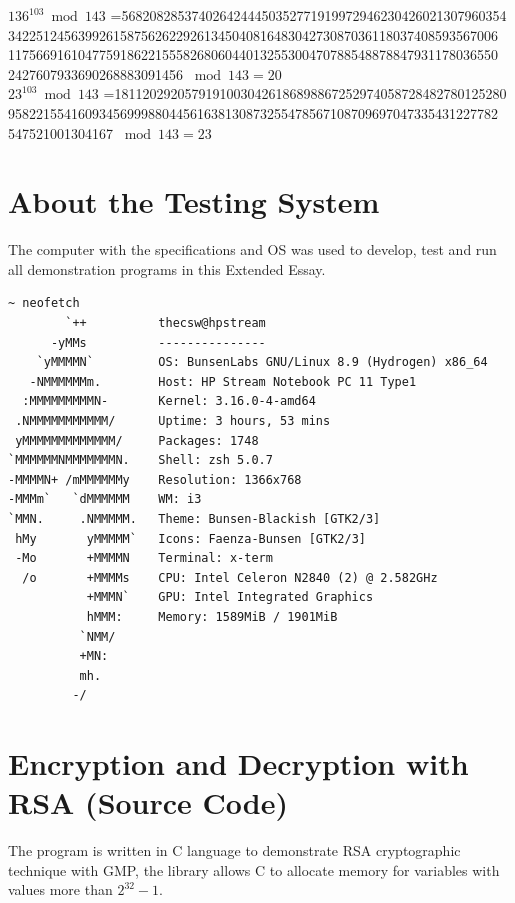\documentclass[a4paper, 12pt]{article}
\begin{document}
$136 ^{103} \bmod 143$ =5682082853740264244450352771919972946230426021307960354
3422512456399261587562622926134504081648304273087036118037408593567006
1175669161047759186221555826806044013255300470788548878847931178036550
2427607933690268883091456 $\bmod 143 = 20$\\

$23 ^{103} \bmod 143$ =18112029205791910030426186898867252974058728482780125280
9582215541609345699988044561638130873255478567108709697047335431227782
547521001304167 $\bmod 143 = 23$\\


\newpage

\section{About the Testing System}
\label{specs}
The computer with the specifications and OS\cite{BunsenLabs}\cite{Debian} was used to develop, test and run all demonstration
programs\cite{github} in this Extended Essay.

\begin{lstlisting}[caption=System Specifications]
  ~ neofetch
        `++          thecsw@hpstream
      -yMMs          ---------------
    `yMMMMN`         OS: BunsenLabs GNU/Linux 8.9 (Hydrogen) x86_64
   -NMMMMMMm.        Host: HP Stream Notebook PC 11 Type1 
  :MMMMMMMMMN-       Kernel: 3.16.0-4-amd64
 .NMMMMMMMMMMM/      Uptime: 3 hours, 53 mins
 yMMMMMMMMMMMMM/     Packages: 1748
`MMMMMMNMMMMMMMN.    Shell: zsh 5.0.7
-MMMMN+ /mMMMMMMy    Resolution: 1366x768
-MMMm`   `dMMMMMM    WM: i3
`MMN.     .NMMMMM.   Theme: Bunsen-Blackish [GTK2/3]
 hMy       yMMMMM`   Icons: Faenza-Bunsen [GTK2/3]
 -Mo       +MMMMN    Terminal: x-term
  /o       +MMMMs    CPU: Intel Celeron N2840 (2) @ 2.582GHz
           +MMMN`    GPU: Intel Integrated Graphics
           hMMM:     Memory: 1589MiB / 1901MiB
          `NMM/ 
          +MN:                               
          mh. 
         -/          
  \end{lstlisting}

\newpage 

\section{Encryption and Decryption with RSA (Source Code)}
\label{big}
The program is written in C\cite{Clang} language to demonstrate RSA cryptographic technique
with GMP\cite{gmp}, the library allows C to allocate memory for variables with values more than $2 ^{32} - 1$. \cite{limit}\\
\end{document}
